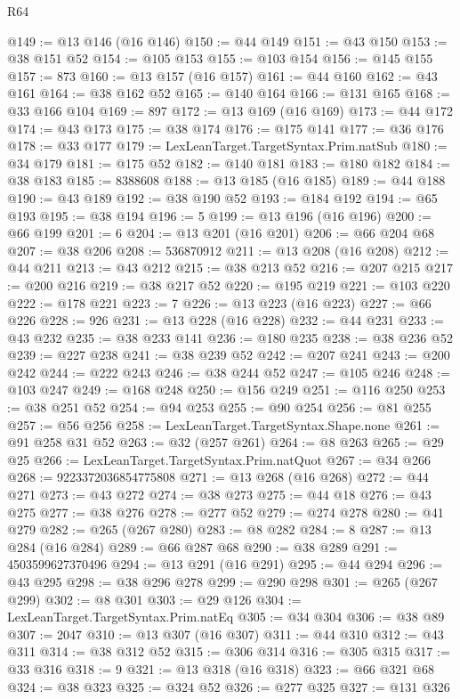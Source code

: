 \begin{lexlean}{R64}
\begin{coremodule}
@149 := @13 @146 (@16 @146)
@150 := @44 @149
@151 := @43 @150
@153 := @38 @151 @52
@154 := @105 @153
@155 := @103 @154
@156 := @145 @155
@157 := 873
@160 := @13 @157 (@16 @157)
@161 := @44 @160
@162 := @43 @161
@164 := @38 @162 @52
@165 := @140 @164
@166 := @131 @165
@168 := @33 @166 @104
@169 := 897
@172 := @13 @169 (@16 @169)
@173 := @44 @172
@174 := @43 @173
@175 := @38 @174
@176 := @175 @141
@177 := @36 @176
@178 := @33 @177
@179 := LexLeanTarget.TargetSyntax.Prim.natSub
@180 := @34 @179
@181 := @175 @52
@182 := @140 @181
@183 := @180 @182
@184 := @38 @183
@185 := 8388608
@188 := @13 @185 (@16 @185)
@189 := @44 @188
@190 := @43 @189
@192 := @38 @190 @52
@193 := @184 @192
@194 := @65 @193
@195 := @38 @194
@196 := 5
@199 := @13 @196 (@16 @196)
@200 := @66 @199
@201 := 6
@204 := @13 @201 (@16 @201)
@206 := @66 @204 @68
@207 := @38 @206
@208 := 536870912
@211 := @13 @208 (@16 @208)
@212 := @44 @211
@213 := @43 @212
@215 := @38 @213 @52
@216 := @207 @215
@217 := @200 @216
@219 := @38 @217 @52
@220 := @195 @219
@221 := @103 @220
@222 := @178 @221
@223 := 7
@226 := @13 @223 (@16 @223)
@227 := @66 @226
@228 := 926
@231 := @13 @228 (@16 @228)
@232 := @44 @231
@233 := @43 @232
@235 := @38 @233 @141
@236 := @180 @235
@238 := @38 @236 @52
@239 := @227 @238
@241 := @38 @239 @52
@242 := @207 @241
@243 := @200 @242
@244 := @222 @243
@246 := @38 @244 @52
@247 := @105 @246
@248 := @103 @247
@249 := @168 @248
@250 := @156 @249
@251 := @116 @250
@253 := @38 @251 @52
@254 := @94 @253
@255 := @90 @254
@256 := @81 @255
@257 := @56 @256
@258 := LexLeanTarget.TargetSyntax.Shape.none
@261 := @91 @258 @31 @52
@263 := @32 (@257 @261)
@264 := @8 @263
@265 := @29 @25
@266 := LexLeanTarget.TargetSyntax.Prim.natQuot
@267 := @34 @266
@268 := 9223372036854775808
@271 := @13 @268 (@16 @268)
@272 := @44 @271
@273 := @43 @272
@274 := @38 @273
@275 := @44 @18
@276 := @43 @275
@277 := @38 @276
@278 := @277 @52
@279 := @274 @278
@280 := @41 @279
@282 := @265 (@267 @280)
@283 := @8 @282
@284 := 8
@287 := @13 @284 (@16 @284)
@289 := @66 @287 @68
@290 := @38 @289
@291 := 4503599627370496
@294 := @13 @291 (@16 @291)
@295 := @44 @294
@296 := @43 @295
@298 := @38 @296 @278
@299 := @290 @298
@301 := @265 (@267 @299)
@302 := @8 @301
@303 := @29 @126
@304 := LexLeanTarget.TargetSyntax.Prim.natEq
@305 := @34 @304
@306 := @38 @89
@307 := 2047
@310 := @13 @307 (@16 @307)
@311 := @44 @310
@312 := @43 @311
@314 := @38 @312 @52
@315 := @306 @314
@316 := @305 @315
@317 := @33 @316
@318 := 9
@321 := @13 @318 (@16 @318)
@323 := @66 @321 @68
@324 := @38 @323
@325 := @324 @52
@326 := @277 @325
@327 := @131 @326

\end{coremodule}
\end{lexlean}
